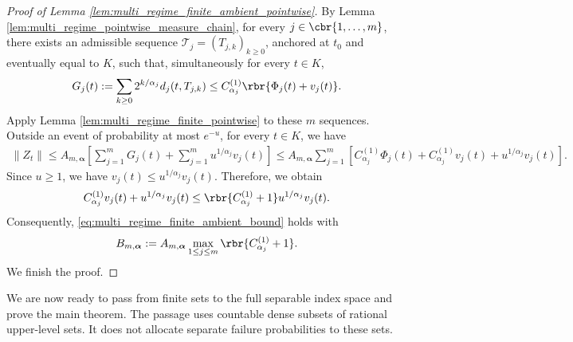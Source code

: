 \documentclass[11pt]{article}
\begin{document}
\begin{proof}[Proof of Lemma
\ref{lem:multi_regime_finite_ambient_pointwise}]
By Lemma \ref{lem:multi_regime_pointwise_measure_chain}, for every
$j\in\cbr{1,\ldots,m}$, there exists an admissible sequence
$\mathcal T_j=(T_{j,k})_{k\ge0}$, anchored at $t_0$ and eventually
equal to $K$, such that, simultaneously for every $t\in K$,
\begin{align*}
G_j(t)
:=
\sum_{k\ge0}2^{k/\alpha_j}d_j(t,T_{j,k})
\le
C_{\alpha_j}^{(1)}
\rbr{\Phi_j(t)+v_j(t)}.
\end{align*}
Apply Lemma \ref{lem:multi_regime_finite_pointwise} to these $m$
sequences. Outside an event of probability at most $e^{-u}$, for every
$t\in K$, we have
\begin{align*}
\|Z_t\|\le
A_{m,\boldsymbol\alpha}
\left[
\sum_{j=1}^mG_j(t)
+
\sum_{j=1}^m u^{1/\alpha_j}v_j(t)
\right]\le
A_{m,\boldsymbol\alpha}
\sum_{j=1}^m
\left[
C_{\alpha_j}^{(1)}\Phi_j(t)
+
C_{\alpha_j}^{(1)}v_j(t)
+
u^{1/\alpha_j}v_j(t)
\right].
\end{align*}
Since $u\ge1$, we have $v_j(t)
\le
u^{1/\alpha_j}v_j(t)$. Therefore, we obtain
\begin{align*}
C_{\alpha_j}^{(1)}v_j(t)
+
u^{1/\alpha_j}v_j(t)
\le
\rbr{C_{\alpha_j}^{(1)}+1}
u^{1/\alpha_j}v_j(t).
\end{align*}
Consequently, \eqref{eq:multi_regime_finite_ambient_bound} holds with
\begin{align*}
B_{m,\boldsymbol\alpha}
:=
A_{m,\boldsymbol\alpha}
\max_{1\le j\le m}
\rbr{C_{\alpha_j}^{(1)}+1}.
\end{align*}
We finish the proof.
\end{proof}

We are now ready to pass from finite sets to the full separable index
space and prove the main theorem. The passage uses countable dense subsets
of rational upper-level sets. It does not allocate separate failure
probabilities to these sets.
\end{document}
